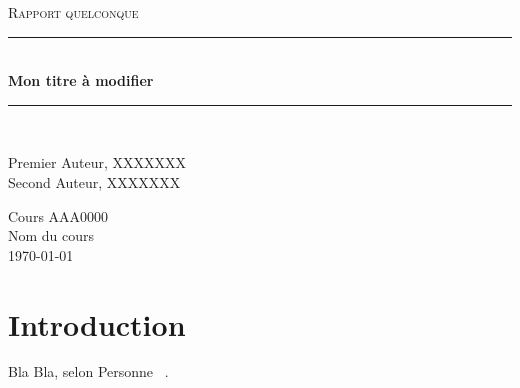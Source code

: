 \documentclass[letterpaper,12pt,final]{article}
\newcommand{\HRule}{\rule{\linewidth}{0.5mm}}
\newcommand{\monTypeDeRapport}{Rapport quelconque}
\newcommand{\monTitre}{Mon titre à modifier}
\newcommand{\mesAuteursX}{Premier Auteur, XXXXXXX \\ Second Auteur, XXXXXXX}
\newcommand{\monCoursX}{AAA0000}
\newcommand{\monCours}{Nom du cours}
\begin{document}
    \begin{titlepage}
      \begin{center}

        \begin{doublespace}

          \vspace*{\fill}
          \textsc{ \large \monTypeDeRapport}
          \vspace*{\fill}

          \HRule \\ [5mm]
          {\huge \bfseries \monTitre}\\ [3mm]
          \HRule \\
          \vspace*{\fill}

          \begin{onehalfspace} \large
            \mesAuteursX
          \end{onehalfspace}

          \vfill
          { \Large Cours \monCoursX \\ \monCours } \\

          \today

        \end{doublespace}
      \end{center}
    \end{titlepage}

\newpage

\section{Introduction}

Bla Bla, selon Personne ~\citep{Personne00}.



\end{document}
